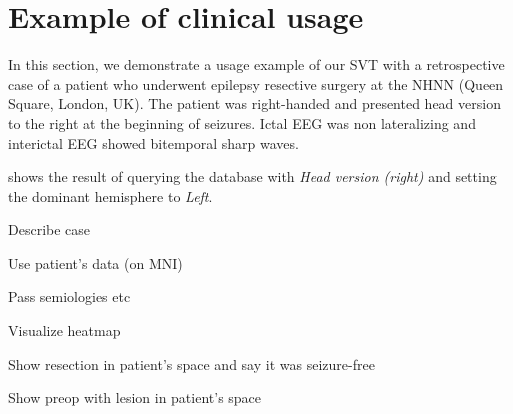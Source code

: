 \section{Example of clinical usage}


In this section, we demonstrate a usage example of our \ac{SVT} with a retrospective case of a patient who underwent epilepsy resective surgery at the \ac{NHNN} (Queen Square, London, UK).
The patient was right-handed and presented head version to the right at the beginning of seizures.
Ictal \ac{EEG} was non lateralizing and interictal \ac{EEG} showed bitemporal sharp waves.

\Cref{} shows the result of querying the database with \textit{Head version (right)} and setting the dominant hemisphere to \textit{Left}.




Describe case

Use patient's data (on MNI)

Pass semiologies etc

Visualize heatmap

Show resection in patient's space and say it was seizure-free

Show preop with lesion in patient's space
